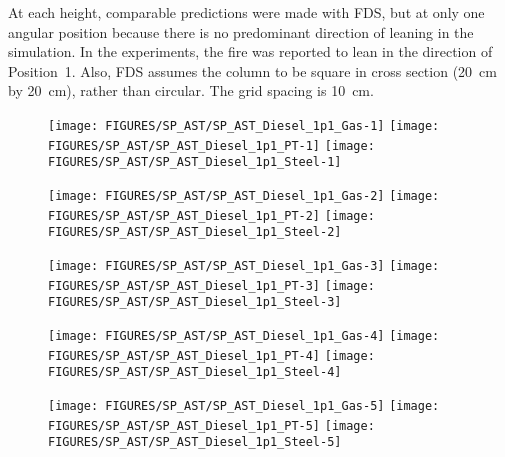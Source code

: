 At each height, comparable predictions were made with FDS, but at only one angular position because there is no predominant direction of leaning in the simulation. In the experiments, the fire was reported to lean in the direction of Position~1. Also, FDS assumes the column to be square in cross section (20~cm by 20~cm), rather than circular. The grid spacing is 10~cm.


\begin{figure}[p]
\begin{center}
\texttt{[image: FIGURES/SP\_AST/SP\_AST\_Diesel\_1p1\_Gas-1]} 
\texttt{[image: FIGURES/SP\_AST/SP\_AST\_Diesel\_1p1\_PT-1]} 
\texttt{[image: FIGURES/SP\_AST/SP\_AST\_Diesel\_1p1\_Steel-1]} 
\end{center}
\label{SP_Diesel_1p1_1m}
\end{figure}

\begin{figure}[p]
\begin{center}
\texttt{[image: FIGURES/SP\_AST/SP\_AST\_Diesel\_1p1\_Gas-2]}
\texttt{[image: FIGURES/SP\_AST/SP\_AST\_Diesel\_1p1\_PT-2]}
\texttt{[image: FIGURES/SP\_AST/SP\_AST\_Diesel\_1p1\_Steel-2]}
\end{center}
\label{SP_Diesel_1p1_2m}
\end{figure}

\begin{figure}[p]
\begin{center}
\texttt{[image: FIGURES/SP\_AST/SP\_AST\_Diesel\_1p1\_Gas-3]}
\texttt{[image: FIGURES/SP\_AST/SP\_AST\_Diesel\_1p1\_PT-3]}
\texttt{[image: FIGURES/SP\_AST/SP\_AST\_Diesel\_1p1\_Steel-3]}
\end{center}
\label{SP_Diesel_1p1_3m}
\end{figure}

\begin{figure}[p]
\begin{center}
\texttt{[image: FIGURES/SP\_AST/SP\_AST\_Diesel\_1p1\_Gas-4]}
\texttt{[image: FIGURES/SP\_AST/SP\_AST\_Diesel\_1p1\_PT-4]}
\texttt{[image: FIGURES/SP\_AST/SP\_AST\_Diesel\_1p1\_Steel-4]}
\end{center}
\label{SP_Diesel_1p1_4m}
\end{figure}

\begin{figure}[p]
\begin{center}
\texttt{[image: FIGURES/SP\_AST/SP\_AST\_Diesel\_1p1\_Gas-5]}
\texttt{[image: FIGURES/SP\_AST/SP\_AST\_Diesel\_1p1\_PT-5]}
\texttt{[image: FIGURES/SP\_AST/SP\_AST\_Diesel\_1p1\_Steel-5]}
\end{center}
\label{SP_Diesel_1p1_5m}
\end{figure}


